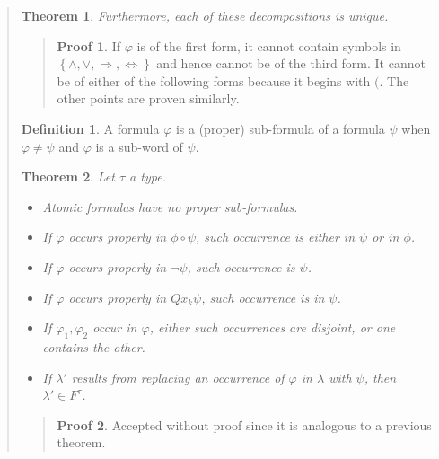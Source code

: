 \documentclass[a4paper, 12pt]{article}
\newtheorem{theorem}{Theorem}
\theoremstyle{definition}
\theoremstyle{definition}
\theoremstyle{definition}
\newtheorem{definition}{Definition}
\newtheorem{pro}{Proof}
\begin{document}
\begin{quote}
\begin{theorem}
    Furthermore, each of these decompositions is unique.
\end{theorem}


\small
\begin{quote}

\begin{pro}

    If $\varphi$ is of the first form, it cannot contain symbols in $\left\{ \land , \lor , \Rightarrow, \iff  \right\} $ 
    and hence cannot be of the third form. It cannot be of either of the following forms 
    because it begins with $($. The other points are proven similarly.
\end{pro}

\end{quote}
\normalsize

\begin{definition}
    A formula $\varphi$ is a (proper) sub-formula of a formula $\psi$ when $\varphi \neq \psi$
    and $\varphi$ is a sub-word of $\psi$.
\end{definition}

\begin{theorem}
    Let $\tau$ a type. 

    \begin{itemize}
        \item Atomic formulas have no proper sub-formulas. 
        \item If $\varphi$ occurs properly in $\phi \circ \psi$, such occurrence 
            is either in $\psi$ or in $\phi$. 
        \item If $\varphi$ occurs properly in $\neg \psi$, such occurrence is $\psi$.
        \item If $\varphi$ occurs properly in $Q x_k \psi$, such occurrence is 
            in $\psi$.
        \item If $\varphi_1, \varphi_2$ occur in $\varphi$, either such occurrences 
            are disjoint, or one contains the other. 
        \item If $\lambda'$ results from replacing an occurrence of $\varphi$ in $\lambda$
            with $\psi$, then $\lambda' \in F^\tau$.
    \end{itemize}
\end{theorem}


\small
\begin{quote}

\begin{pro}
    Accepted without proof since it is analogous to a previous theorem.
\end{pro}


\end{quote}
\end{quote}
\end{document}
